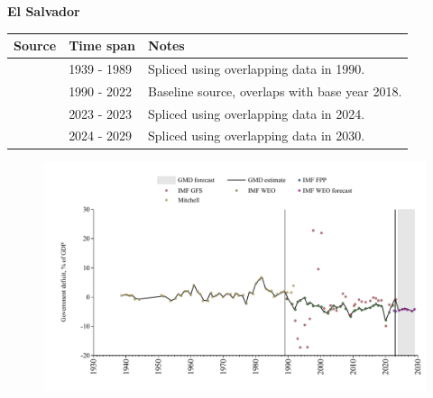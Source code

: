 \documentclass[12pt,a4paper,landscape]{article}
\begin{document}
\begin{adjustbox}{max totalsize={\paperwidth}{\paperheight},center}
\begin{minipage}[t][\textheight][t]{\textwidth}
\vspace*{0.5cm}
{}
\begin{center}
{\Large\bfseries El Salvador}
\end{center}
\vspace{0.5cm}
\begin{table}[H]
\centering
\small
\begin{tabular}{|l|l|l|}
\hline
\textbf{Source} & \textbf{Time span} & \textbf{Notes} \\
\hline
\rowcolor{white}\cite{Mitchell}& 1939 - 1989 &Spliced using overlapping data in 1990.\\
\rowcolor{lightgray}\cite{IMF_WEO}& 1990 - 2022 &Baseline source, overlaps with base year 2018.\\
\rowcolor{white}\cite{IMF_GFS}& 2023 - 2023 &Spliced using overlapping data in 2024.\\
\rowcolor{lightgray}\cite{IMF_WEO_forecast}& 2024 - 2029 &Spliced using overlapping data in 2030.\\
\hline
\end{tabular}
\end{table}
\begin{figure}[H]
\centering
\includegraphics[width=\textwidth,height=0.6\textheight,keepaspectratio]{graphs/SLV_govdef_GDP.pdf}
\end{figure}
\end{minipage}
\end{adjustbox}
\end{document}
